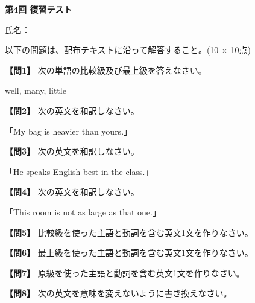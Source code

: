 
\begin{center}
{\Large\textbf{第4回 復習テスト}}
\end{center}
\vspace{0.15em}
\begin{flushright}
氏名：\testnameblank
\end{flushright}
\vspace{0.25em}
\noindent 以下の問題は、配布テキストに沿って解答すること。(10 $\times$ 10点)
\vspace{0.35em}

\noindent\textbf{【問1】} 次の単語の比較級及び最上級を答えなさい。

well, many, little
\testqsepsmall

\noindent\textbf{【問2】} 次の英文を和訳しなさい。

「My bag is heavier than yours.」
\testqsepsmall

\noindent\textbf{【問3】} 次の英文を和訳しなさい。

「He speaks English best in the class.」
\testqsepsmall

\noindent\textbf{【問4】} 次の英文を和訳しなさい。

「This room is not as large as that one.」
\testqsep

\noindent\textbf{【問5】} 比較級を使った主語と動詞を含む英文1文を作りなさい。

\testqsep

\noindent\textbf{【問6】} 最上級を使った主語と動詞を含む英文1文を作りなさい。

\testqsep

\noindent\textbf{【問7】} 原級を使った主語と動詞を含む英文1文を作りなさい。

\testqsep

\noindent\textbf{【問8】} 次の英文を意味を変えないように書き換えなさい。


